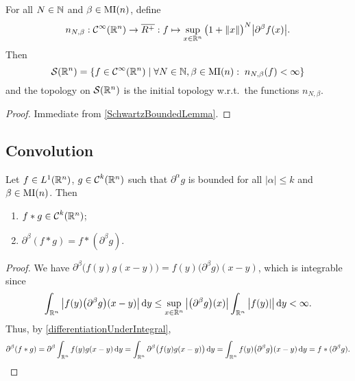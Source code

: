 \begin{proposition} \label{SchwartzAlternateDefinition}
For all $N\in \mathbb{N}$ and $\beta\in\operatorname{MI}(n)$, define
\[ n_{N,\beta}: \operatorname{\mathcal{C}}^{\infty}(\mathbb{R}^n) \to \overline{R^+}: f \mapsto \sup_{x\in\mathbb{R}^n}\big(1+ \lVert x\rVert\big)^N\big|\partial^\beta f(x)\big|. \]
Then
\[ \Schwartz(\R^n) = \setbuilder{f\in \cont^\infty(\R^n)}{\forall N\in \N,\beta\in\multiIndex(n):\;n_{N,\beta}(f)<\infty} \]
and the topology on $\operatorname{\mathcal{S}}(\mathbb{R}^n)$ is the initial topology w.r.t.\ the functions $n_{N,\beta}$.
\end{proposition}
\begin{proof}
Immediate from \ref{SchwartzBoundedLemma}.
\end{proof}

\subsection{Convolution}

\begin{proposition} \label{derivativeConvolution}
Let $f\in L^1(\mathbb{R}^n)$, $g\in \operatorname{\mathcal{C}}^k(\mathbb{R}^n)$ such that $\partial^\alpha g$ is bounded for all $|\alpha|\leq k$ and $\beta\in \operatorname{MI}(n)$. Then
\begin{enumerate}
\item $f* g \in \operatorname{\mathcal{C}}^k(\mathbb{R}^n)$;
\item $\partial^\beta(f*g) = f*(\partial^\beta g)$.
\end{enumerate}
\end{proposition}
\begin{proof}
We have $\partial^\beta\big(f(y)g(x-y)\big) = f(y)\big(\partial^\beta g\big)(x-y)$, which is integrable since
\[ \int_{\mathbb{R}^n}\big|f(y)\big(\partial^\beta g\big)(x-y)\big|\operatorname{d \!}{y} \leq \sup_{x\in \mathbb{R}^n}\big|\big(\partial^\beta g\big)(x)\big|\int_{\mathbb{R}^n}\big|f(y)|\big|\operatorname{d \!}{y} < \infty. \]
Thus, by \ref{differentiationUnderIntegral},
\[ \partial^\beta(f*g) = \partial^\beta \int_{\mathbb{R}^n}f(y)g(x-y)\operatorname{d \!}{y} = \int_{\mathbb{R}^n}\partial^\beta \big(f(y)g(x-y)\big)\operatorname{d \!}{y} = \int_{\mathbb{R}^n}f(y)\big(\partial^\beta g\big)(x-y)\operatorname{d \!}{y} = f*(\partial^\beta g).  \]
\end{proof}

